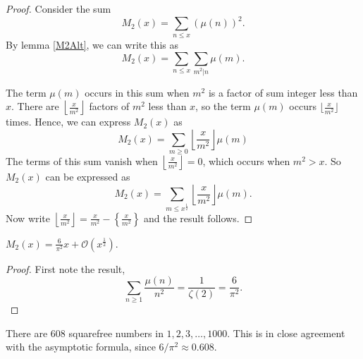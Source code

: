 \documentclass{unswmaths}
\begin{document}
\begin{proof}
    Consider the sum
    \begin{equation*}
        M_2(x) = \sum_{n\leq x} (\mu(n))^2.
    \end{equation*}
    By lemma \ref{M2Alt}, we can write this as
    \begin{equation*}
        M_2(x) = \sum_{n\leq x}\sum_{m^2|n}\mu(m).
    \end{equation*}
    
    The term $\mu(m)$ occurs in this sum when $m^2$ is a factor of sum integer
    less than $x$. There are $\left\lfloor \frac{x}{m^2}\right\rfloor$ factors of $m^2$
    less than $x$, so the term $\mu(m)$ occurs $\lfloor \frac{x}{m^2}\rfloor$
    times. Hence, we can express $M_2(x)$ as
    \begin{equation*}
        M_2(x) = \sum_{m\geq0} \left\lfloor\frac{x}{m^2}\right\rfloor\mu(m)
    \end{equation*}
    The terms of this sum vanish when $\left\lfloor \frac{x}{m^2}\right\rfloor = 0$,
    which occurs when $m^2 > x$. So $M_2(x)$ can be expressed as
    \begin{equation*}
        M_2(x) = \sum_{m\leq x^\frac{1}{2}}\left\lfloor\frac{x}{m^2}\right\rfloor\mu(m).
    \end{equation*}
    Now write $\left\lfloor\frac{x}{m^2}\right\rfloor = \frac{x}{m^2}-\left\{\frac{x}{m^2}\right\}$
    and the result follows.
\end{proof}
\begin{theorem}
    $M_2(x) = \frac{6}{\pi^2}x+\mathcal{O}(x^\frac{1}{2})$.
\end{theorem}
\begin{proof}
    First note the result,
    \begin{equation*}
        \sum_{n\geq 1} \frac{\mu(n)}{n^2} = \frac{1}{\zeta(2)} = \frac{6}{\pi^2}.
    \end{equation*}
    
    
\end{proof}
\begin{remark}
    There are $608$ squarefree numbers in $1,2,3,\ldots,1000$. 
    This is in close agreement with the asymptotic formula,
    since $6/\pi^2 \approx 0.608$.
\end{remark}
\end{document}
